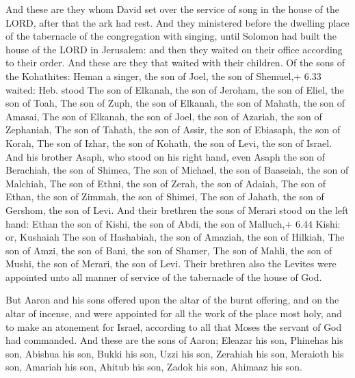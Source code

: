  And these are they whom David set over the service of song
in the house of the LORD, after that the ark had rest.  And
they ministered before the dwelling place of the tabernacle of the
congregation with singing, until Solomon had built the house of the LORD
in Jerusalem: and then they waited on their office according to their
order.  And these are they that waited with their children.
Of the sons of the Kohathites: Heman a singer, the son of Joel, the son
of Shemuel,+ 6.33 waited: Heb. stood  The son of Elkanah,
the son of Jeroham, the son of Eliel, the son of Toah,  The
son of Zuph, the son of Elkanah, the son of Mahath, the son of Amasai,
 The son of Elkanah, the son of Joel, the son of Azariah,
the son of Zephaniah,  The son of Tahath, the son of Assir,
the son of Ebiasaph, the son of Korah,  The son of Izhar,
the son of Kohath, the son of Levi, the son of Israel.  And
his brother Asaph, who stood on his right hand, even Asaph the son of
Berachiah, the son of Shimea,  The son of Michael, the son
of Baaseiah, the son of Malchiah,  The son of Ethni, the
son of Zerah, the son of Adaiah,  The son of Ethan, the son
of Zimmah, the son of Shimei,  The son of Jahath, the son
of Gershom, the son of Levi.  And their brethren the sons
of Merari stood on the left hand: Ethan the son of Kishi, the son of
Abdi, the son of Malluch,+ 6.44 Kishi: or, Kushaiah  The
son of Hashabiah, the son of Amaziah, the son of Hilkiah, 
The son of Amzi, the son of Bani, the son of Shamer,  The
son of Mahli, the son of Mushi, the son of Merari, the son of Levi.
 Their brethren also the Levites were appointed unto all
manner of service of the tabernacle of the house of God.

 But Aaron and his sons offered upon the altar of the
burnt offering, and on the altar of incense, and were appointed for all
the work of the place most holy, and to make an atonement for Israel,
according to all that Moses the servant of God had commanded.
 And these are the sons of Aaron; Eleazar his son, Phinehas
his son, Abishua his son,  Bukki his son, Uzzi his son,
Zerahiah his son,  Meraioth his son, Amariah his son,
Ahitub his son,  Zadok his son, Ahimaaz his son.

